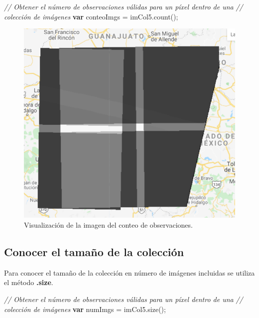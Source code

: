 \documentclass[
  12pt,
  letterpaper,
  twoside]{book}
\newenvironment{Shaded}{\begin{snugshade}}{\end{snugshade}}
\newcommand{\CommentTok}[1]{\textcolor[rgb]{0.24,0.58,0.00}{\textit{#1}}}
\newcommand{\FunctionTok}[1]{\textcolor[rgb]{0.48,0.12,0.64}{#1}}
\newcommand{\KeywordTok}[1]{\textcolor[rgb]{0.00,0.00,0.00}{\textbf{#1}}}
\newcommand{\NormalTok}[1]{#1}
\newcommand{\OperatorTok}[1]{\textcolor[rgb]{0.00,0.00,0.00}{#1}}
\newcommand\boldpurple[1]{\textcolor{darkpurple}{\textbf{#1}}}
\begin{document}
\begin{Shaded}
\begin{Highlighting}[]
\CommentTok{// Obtener el número de observaciones válidas para un píxel dentro de una }
\CommentTok{// colección de imágenes}
\KeywordTok{var}\NormalTok{ conteoImgs }\OperatorTok{=}\NormalTok{ imCol5}\OperatorTok{.}\FunctionTok{count}\NormalTok{()}\OperatorTok{;}
\end{Highlighting}
\end{Shaded}

\begin{figure}[H]

{\centering \includegraphics[width=0.8\linewidth]{Img/conteoim} 

}

\caption{Visualización de la imagen del conteo de observaciones.}\label{fig:f109}
\end{figure}

\hypertarget{conocer-el-tamauxf1o-de-la-colecciuxf3n}{%
\subsection*{Conocer el tamaño de la colección}\label{conocer-el-tamauxf1o-de-la-colecciuxf3n}}

Para conocer el tamaño de la colección en número de imágenes incluidas se utiliza el método \boldpurple{.size}.

\begin{Shaded}
\begin{Highlighting}[]
\CommentTok{// Obtener el número de observaciones válidas para un píxel dentro de una }
\CommentTok{// colección de imágenes}
\KeywordTok{var}\NormalTok{ numImgs }\OperatorTok{=}\NormalTok{ imCol5}\OperatorTok{.}\FunctionTok{size}\NormalTok{()}\OperatorTok{;}
\end{Highlighting}
\end{Shaded}
\end{document}
